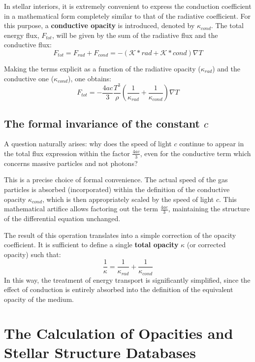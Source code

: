 In stellar interiors, it is extremely convenient to express the conduction coefficient in a mathematical form completely similar to that of the radiative coefficient. For this purpose, a \textbf{conductive opacity} is introduced, denoted by $\kappa_{cond}$. The total energy flux, $F_{tot}$, will be given by the sum of the radiative flux and the conductive flux:
\begin{equation}
F_{tot} = F_{rad} + F_{cond} = - \left( \mathcal{K}*{rad} + \mathcal{K}*{cond} \right) \nabla T
\end{equation}

Making the terms explicit as a function of the radiative opacity ($\kappa_{rad}$) and the conductive one ($\kappa_{cond}$), one obtains:
\begin{equation}
F_{tot} = - \frac{4ac}{3} \frac{T^3}{\rho} \left( \frac{1}{\kappa_{rad}} + \frac{1}{\kappa_{cond}} \right) \nabla T
\end{equation}

\subsection{The formal invariance of the constant $c$}
A question naturally arises: why does the speed of light $c$ continue to appear in the total flux expression within the factor $\frac{4ac}{3}$, even for the conductive term which concerns massive particles and not photons?

This is a precise choice of formal convenience. The actual speed of the gas particles is absorbed (incorporated) within the definition of the conductive opacity $\kappa_{cond}$, which is then appropriately scaled by the speed of light $c$. This mathematical artifice allows factoring out the term $\frac{4ac}{3}$, maintaining the structure of the differential equation unchanged.

The result of this operation translates into a simple correction of the opacity coefficient. It is sufficient to define a single \textbf{total opacity} $\kappa$ (or corrected opacity) such that:
\begin{equation}
\frac{1}{\kappa} = \frac{1}{\kappa_{rad}} + \frac{1}{\kappa_{cond}}
\end{equation}
In this way, the treatment of energy transport is significantly simplified, since the effect of conduction is entirely absorbed into the definition of the equivalent opacity of the medium.

\section{The Calculation of Opacities and Stellar Structure Databases}

